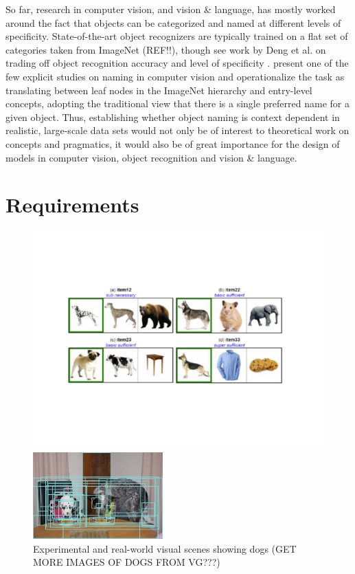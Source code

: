 \documentclass[runningheads]{llncs}
\begin{document}
So far, research in computer vision, and vision \& language, has mostly worked around the fact that objects can be categorized and named at different levels of specificity.
 State-of-the-art object recognizers are typically trained on a flat set of categories taken from ImageNet (REF!!), though see work by Deng et al. on trading off object recognition accuracy and level of specificity \cite{deng2012hedging}.
\cite{Ordonez:2016} present one of the few explicit studies on naming in computer vision and operationalize the task as translating between leaf nodes in the ImageNet hierarchy and entry-level
 concepts, adopting the traditional view that there is a single preferred name for a given object.
 Thus, establishing whether object naming is context dependent in realistic, large-scale data sets would not only be of interest to theoretical work on concepts and pragmatics, it would also be of great importance for the design of models in computer vision, object recognition and vision \& language.

\section{Requirements}
\label{sec:requirements}

\begin{figure}[t]
	\begin{center}
		\begin{minipage}{.52\textwidth}
			\includegraphics[width=\linewidth]{fig/graffig.pdf}
		\end{minipage}
		\begin{minipage}{.42\textwidth}
			\includegraphics[width=5cm]{fig/visual_genome_dogs.png}
		\end{minipage}
	\end{center}
	\caption{Experimental and real-world visual scenes showing dogs (GET MORE IMAGES OF DOGS FROM VG???)}
	\label{fig:graf_genome}
\end{figure}
\end{document}
